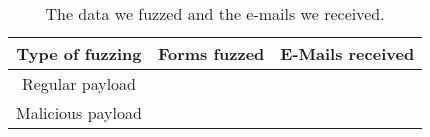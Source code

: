 \begin{table}[tbp]
	\centering
	\scriptsize
	\begin{tabular}{|c|c|c|}
		\hline
		\multicolumn{1}{|c|}{\textbf{Type of fuzzing}} &
		\multicolumn{1}{c|}{\textbf{Forms fuzzed}} &
		\multicolumn{1}{c|}{\textbf{E-Mails received}}\\
		\hline
		Regular payload & \fuzzed & \recd \\
		\hline
		Malicious payload & \malfuzzed & \success \\
		\hline
	\end{tabular}
	\caption[]{The data we fuzzed and the e-mails we received.}
    \vspace{-5ex}    
	\label{tab:fuzzed_data}
\end{table}
